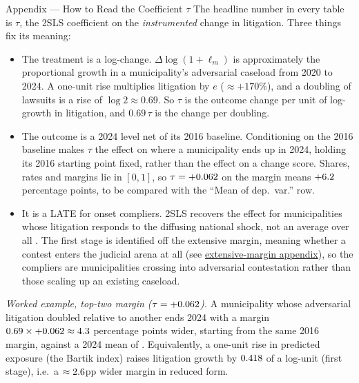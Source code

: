 

\begin{frame}{Appendix --- How to Read the Coefficient $\tau$}
\hypertarget{app:readtau}{}
\small
The headline number in every table is $\tau$, the 2SLS coefficient on the \emph{instrumented} change in litigation. Three things fix its meaning:
\smallskip
\begin{itemize}\itemsep3pt
  \item The treatment is a log-change. $\Delta\log(1+\ell_m)$ is approximately the proportional growth in a municipality's adversarial caseload from 2020 to 2024. A one-unit rise multiplies litigation by $e$ ($\approx+170\%$), and a doubling of lawsuits is a rise of $\log 2 \approx 0.69$. So $\tau$ is the outcome change per unit of log-growth in litigation, and $0.69\,\tau$ is the change per doubling.
  \item The outcome is a 2024 level net of its 2016 baseline. Conditioning on the 2016 baseline makes $\tau$ the effect on where a municipality ends up in 2024, holding its 2016 starting point fixed, rather than the effect on a change score. Shares, rates and margins lie in $[0,1]$, so $\tau=+0.062$ on the margin means $+6.2$ percentage points, to be compared with the ``Mean of dep.\ var.'' row.
  \item It is a LATE for onset compliers. 2SLS recovers the effect for municipalities whose litigation responds to the diffusing national shock, not an average over all \NMunis. The first stage is identified off the extensive margin, meaning whether a contest enters the judicial arena at all (see \hyperlink{app:extensive}{extensive-margin appendix}), so the compliers are municipalities crossing into adversarial contestation rather than those scaling up an existing caseload.
\end{itemize}
\smallskip
\footnotesize \emph{Worked example, top-two margin ($\tau=+0.062$).} A municipality whose adversarial litigation doubled relative to another ends 2024 with a margin $0.69\times+0.062\approx4.3$ percentage points wider, starting from the same 2016 margin, against a 2024 mean of \MarginMean. Equivalently, a one-unit rise in predicted exposure (the Bartik index) raises litigation growth by $0.418$ of a log-unit (first stage), i.e.\ a $\approx2.6$pp wider margin in reduced form.\hfill\hyperlink{src:spec}{}
\end{frame}
